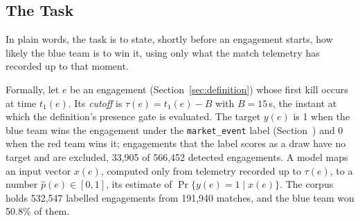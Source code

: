 \subsection{The Task}\label{sec:pred-task}

In plain words, the task is to state, shortly before an engagement starts, how likely the blue team is
to win it, using only what the match telemetry has recorded up to that moment.

Formally, let $e$ be an engagement (Section~\ref{sec:definition}) whose first kill occurs at time
$t_1(e)$. Its \emph{cutoff} is $\tau(e) = t_1(e) - B$ with $B = 15$\,s, the instant at which the
definition's presence gate is evaluated. The target $y(e)$ is 1 when the blue team wins the engagement
under the \texttt{market\_event} label (Section~) and 0 when the red team wins it;
engagements that the label scores as a draw have no target and are excluded, 33,905 of 566,452 detected
engagements. A model maps an input vector $x(e)$, computed only from telemetry recorded up to $\tau(e)$,
to a number $\hat p(e) \in [0, 1]$, its estimate of $\Pr\{y(e) = 1 \mid x(e)\}$. The corpus holds
532,547 labelled engagements from 191,940 matches, and the blue team won 50.8\% of them.

